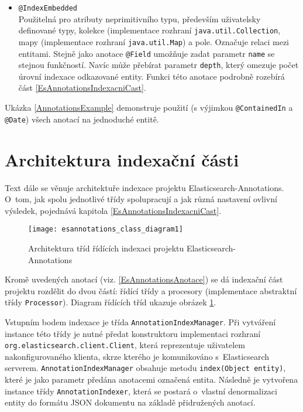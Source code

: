 \documentclass[11pt,oneside]{fithesis2}
\begin{document}
\begin{itemize}
	\item \texttt{@IndexEmbedded} \\
	Použitelná pro atributy neprimitivního typu, především uživatelsky definované typy, kolekce (implementace rozhraní \texttt{java.util.Collection}, mapy (implementace rozhraní \texttt{java.util.Map}) a pole. Označuje relaci mezi entitami. Stejně jako anotace \texttt{@Field} umožňuje zadat parametr \texttt{name} se stejnou funkčností. Navíc může přebírat parametr \texttt{depth}, který omezuje počet úrovní indexace odkazované entity. Funkci této anotace podrobně rozebírá část \ref{EsAnnotationsIndexacniCast}.
\end{itemize}

Ukázka \ref{AnnotationsExample} demonstruje použití (s výjimkou \texttt{@ContainedIn} a \texttt{@Date}) všech anotací na jednoduché entitě.

\section{Architektura indexační části}
Text dále se věnuje architektuře indexace projektu Elasticsearch-Annotations. O~tom, jak spolu jednotlivé třídy spolupracují a jak různá nastavení ovlivní výsledek, pojednává kapitola \ref{EsAnnotationsIndexacniCast}.

\begin{figure}[h]
	\begin{center}
		\texttt{[image: esannotations\_class\_diagram1]}
	\end{center}
	\caption{Architektura tříd řídících indexaci projektu Elasticsearch-Annotations}	
	\label{EsAnnotationsIndexaceArchitektura1}
\end{figure}

Kromě uvedených anotací (viz. \ref{EsAnnotationsAnotace}) se dá indexační část projektu rozdělit do dvou částí: řídící třídy a procesory (implementace abstraktní třídy \texttt{Processor}). Diagram řídících tříd ukazuje obrázek \ref{EsAnnotationsIndexaceArchitektura1}.

Vstupním bodem indexace je třída \texttt{AnnotationIndexManager}. Při vytváření instance této třídy je nutné předat konstruktoru implementaci rozhraní \texttt{org.elasticsearch.client.Client}, která reprezentuje uživatelem nakonfigurovaného klienta, skrze kterého je komunikováno s~Elasticsearch serverem. \texttt{AnnotationIndexManager} obsahuje metodu \texttt{index(Object entity)}, které je jako parametr předána anotacemi označená entita. Následně je vytvořena instance třídy \texttt{AnnotationIndexer}, která se postará o~vlastní denormalizaci entity do formátu JSON dokumentu na základě přidružených anotací.
\end{document}
